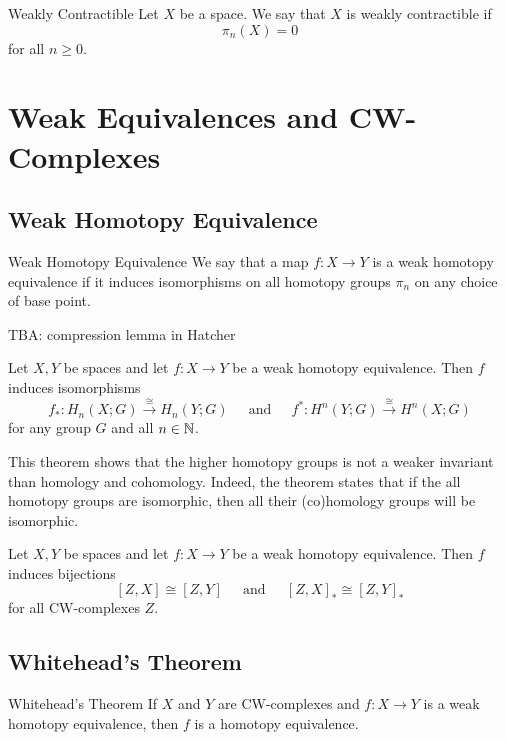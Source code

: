 \documentclass[a4paper]{article}
\begin{document}
\begin{defn}{Weakly Contractible}{} Let $X$ be a space. We say that $X$ is weakly contractible if $$\pi_n(X)=0$$ for all $n\geq 0$. 
\end{defn}

\pagebreak
\section{Weak Equivalences and CW-Complexes}
\subsection{Weak Homotopy Equivalence}
\begin{defn}{Weak Homotopy Equivalence}{} We say that a map $f:X\to Y$ is a weak homotopy equivalence if it induces isomorphisms on all homotopy groups $\pi_n$ on any choice of base point. 
\end{defn}

TBA: compression lemma in Hatcher

\begin{thm}{}{} Let $X,Y$ be spaces and let $f:X\to Y$ be a weak homotopy equivalence. Then $f$ induces isomorphisms $$f_\ast:H_n(X;G)\overset{\cong}{\longrightarrow}H_n(Y;G)\;\;\;\;\text{ and }\;\;\;\;f^\ast:H^n(Y;G)\overset{\cong}{\longrightarrow}H^n(X;G)$$ for any group $G$ and all $n\in\mathbb{N}$. 
\end{thm}

This theorem shows that the higher homotopy groups is not a weaker invariant than homology and cohomology. Indeed, the theorem states that if the all homotopy groups are isomorphic, then all their (co)homology groups will be isomorphic. 

\begin{prp}{}{} Let $X,Y$ be spaces and let $f:X\to Y$ be a weak homotopy equivalence. Then $f$ induces bijections $$[Z,X]\cong[Z,Y]\;\;\;\;\text{ and }\;\;\;\;[Z,X]_\ast\cong[Z,Y]_\ast$$ for all CW-complexes $Z$. 
\end{prp}

\subsection{Whitehead's Theorem}
\begin{thm}{Whitehead's Theorem}{} If $X$ and $Y$ are CW-complexes and $f:X\to Y$ is a weak homotopy equivalence, then $f$ is a homotopy equivalence. 
\end{thm}
\end{document}
